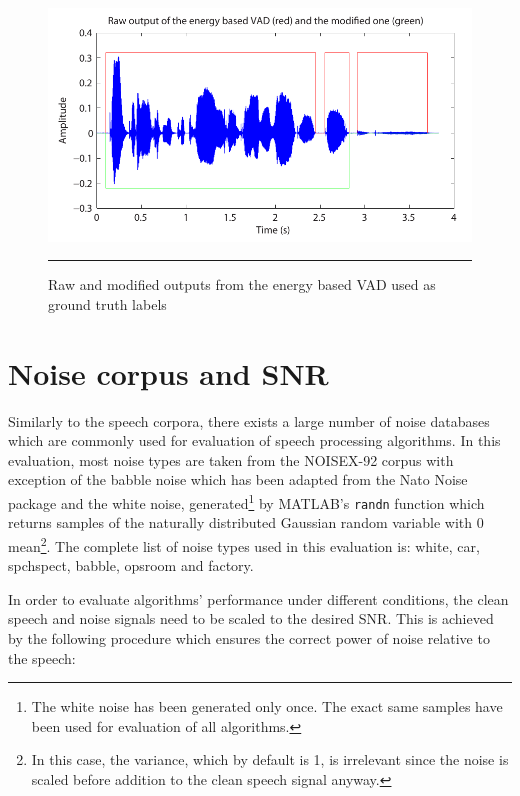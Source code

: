 \begin{figure}[htbp]
	\centering
		\includegraphics[width=0.9\columnwidth]{Figures/Chapter3/groundtruth.pdf}
		\rule{37em}{0.5pt}
	\caption[Raw and modified outputs from the energy based VAD used as ground truth labels]{Raw and modified outputs from the energy based VAD used as ground truth labels}
	\label{fig:groundtruth}
\end{figure}


\section{Noise corpus and SNR}

Similarly to the speech corpora, there exists a large number of noise databases which are commonly used for evaluation of speech processing algorithms. In this evaluation, most noise types are taken from the NOISEX-92 \cite{NOISEX} corpus with exception of the babble noise which has been adapted from the Nato Noise \cite{Nato} package and the white noise, generated\footnote{The white noise has been generated only once. The exact same samples have been used for evaluation of all algorithms.} by MATLAB's \texttt{randn} function which returns samples of the naturally distributed Gaussian random variable with 0 mean\footnote{In this case, the variance, which by default is 1, is irrelevant since the noise is scaled before addition to the clean speech signal anyway.}. The complete list of noise types used in this evaluation is: white, car, spchspect, babble, opsroom and factory.

In order to evaluate algorithms' performance under different conditions, the clean speech and noise signals need to be scaled to the desired SNR. This is achieved by the following procedure which ensures the correct power of noise relative to the speech:


